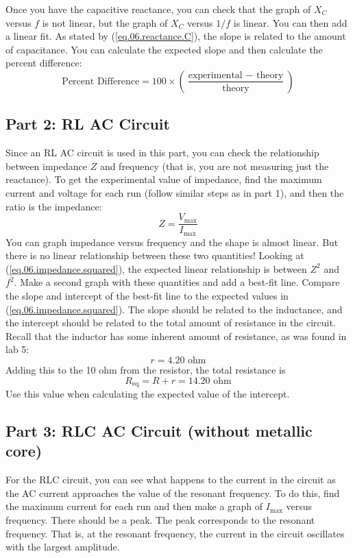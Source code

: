 Once you have the capacitive reactance, you can check that the graph of $X_{C}$ versus $f$ is not linear, but the graph of $X_{C}$ versus $1/f$ is linear. You can then add a linear fit. As stated by (\ref{eq.06.reactance.C}), the slope is related to the amount of capacitance. You can calculate the expected slope and then calculate the percent difference:
\begin{equation}
	\text{Percent Difference} = 100 \times \left( \frac{\text{experimental } - \text{ theory}}{\text{theory}} \right)
\end{equation}
\subsection{Part 2: RL AC Circuit}
Since an RL AC circuit is used in this part, you can check the relationship between impedance $Z$ and frequency (that is, you are not measuring just the reactance). To get the experimental value of impedance, find the maximum current and voltage for each run (follow similar steps as in part 1), and then the ratio is the impedance:
\begin{equation}
	Z = \frac{V_{\text{max}}}{I_{\text{max}}}
\end{equation}
You can graph impedance versus frequency and the shape is almost linear. But there is no linear relationship between these two quantities! Looking at (\ref{eq.06.impedance.squared}), the expected linear relationship is between $Z^{2}$ and $f^{2}$. Make a second graph with these quantities and add a best-fit line. Compare the slope and intercept of the best-fit line to the expected values in (\ref{eq.06.impedance.squared}). The slope should be related to the inductance, and the intercept should be related to the total amount of resistance in the circuit. Recall that the inductor has some inherent amount of resistance, as was found in lab 5:
\begin{equation}
	r = 4.20 \text{ ohm}
\end{equation}
Adding this to the 10 ohm from the resistor, the total resistance is
\begin{equation}
	R_{\text{eq}} = R + r = 14.20 \text{ ohm}
\end{equation}
Use this value when calculating the expected value of the intercept.
\subsection{Part 3: RLC AC Circuit (without metallic core)}
For the RLC circuit, you can see what happens to the current in the circuit as the AC current approaches the value of the resonant frequency. To do this, find the maximum current for each run and then make a graph of $I_{\text{max}}$ versus frequency. There should be a peak. The peak corresponds to the resonant frequency. That is, at the resonant frequency, the current in the circuit oscillates with the largest amplitude.

